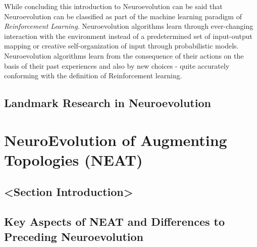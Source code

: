 \documentclass[journal, a4paper]{IEEEtran}
\begin{document}
While concluding this introduction to Neuroevolution can be said that Neuroevolution can be classified as part of the machine learning paradigm of \textit{Reinforcement Learning}. Neuroevolution algorithms learn through ever-changing interaction with the environment instead of a predetermined set of input-output mapping or creative self-organization of input through probabilistic models. Neuroevolution algorithms learn from the consequence of their actions on the basis of their past experiences and also by new choices - quite accurately conforming with the definition of Reinforcement learning.


\subsection{Landmark Research in Neuroevolution}

















\section{NeuroEvolution of Augmenting Topologies (NEAT)}

\subsection{<Section Introduction>}

\subsection{Key Aspects of NEAT and Differences to Preceding Neuroevolution}
\end{document}
